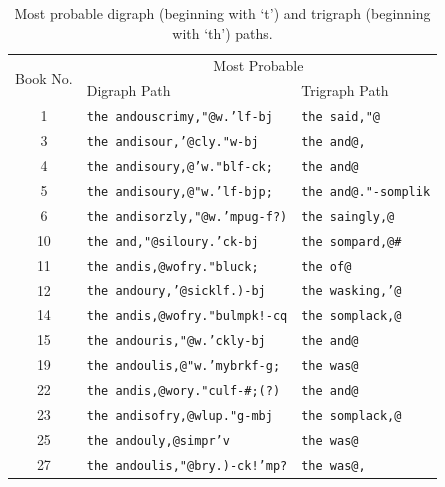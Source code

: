 \documentclass[conference]{IEEEtran}
\newcommand{\codeintable}[1]{{\fontsize{6.215}{7.458}\selectfont\texttt{#1}}}
\begin{document}
\begin{table}
\caption{\hspace{2em}Most probable digraph (beginning with `t') and \newline 
trigraph (beginning with `th') paths.\label{tab:problem1f}}
\vspace{-10pt}
\begin{center}
\begin{tabular}{cll}
\hline 
\multirow{2}{*}{Book No.} & \multicolumn{2}{c}{Most Probable}  \\
\cline{2-3}
 & Digraph Path & Trigraph Path \\
\hline
1  & \codeintable{the andouscrimy,"@w.'lf-bj} & \codeintable{the said,"@} \\
3  & \codeintable{the andisour,'@cly."w-bj} & \codeintable{the and@,} \\
4  & \codeintable{the andisoury,@'w."blf-ck;} & \codeintable{the and@} \\
5  & \codeintable{the andisoury,@"w.'lf-bjp;} & \codeintable{the and@."-somplik} \\
6  & \codeintable{the andisorzly,"@w.'mpug-f?)} & \codeintable{the saingly,@} \\
10 & \codeintable{the and,"@siloury.'ck-bj} & \codeintable{the sompard,@\#} \\
11 & \codeintable{the andis,@wofry."bluck;} & \codeintable{the of@} \\
12 & \codeintable{the andoury,'@sicklf.)-bj} & \codeintable{the wasking,'@} \\
14 & \codeintable{the andis,@wofry."bulmpk!-cq} & \codeintable{the somplack,@} \\
15 & \codeintable{the andouris,"@w.'ckly-bj} & \codeintable{the and@} \\
19 & \codeintable{the andoulis,@"w.'mybrkf-g;} & \codeintable{the was@} \\
22 & \codeintable{the andis,@wory."culf-\#;(?)} & \codeintable{the and@} \\
23 & \codeintable{the andisofry,@wlup."g-mbj} & \codeintable{the somplack,@} \\
25 & \codeintable{the andouly,@simpr'v} & \codeintable{the was@} \\
27 & \codeintable{the andoulis,"@bry.)-ck!'mp?} & \codeintable{the was@,} \\
\hline
\end{tabular}
\end{center}
\end{table}
\end{document}
